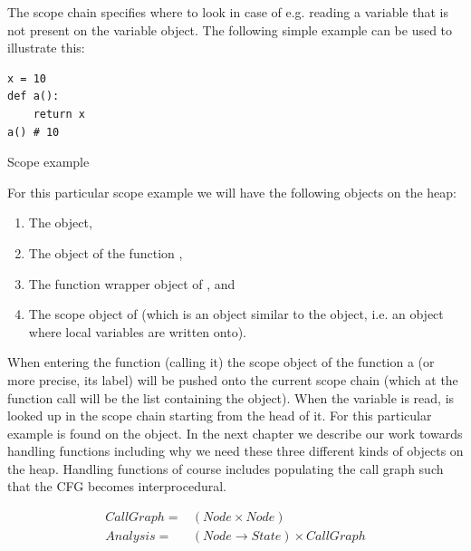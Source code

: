 The scope chain specifies where to look in case of e.g. reading a variable that is not present on the variable object. The following simple example can be used to illustrate this:

\begin{listing}[H]
	\begin{verbatim}
x = 10
def a():
	return x
a() # 10
	\end{verbatim}
\caption{Scope example}\label{code:ScopeExample}
\end{listing}

For this particular scope example we will have the following objects on the heap:

\begin{enumerate}
  \item The  object,
  \item The object of the function ,
  \item The function wrapper object of , and
  \item The scope object of  (which is an object similar to the  object, i.e. an object where local variables are written onto).
\end{enumerate}

When entering the function (calling it) the scope object of the function a (or more precise, its label) will be pushed onto the current scope chain (which at the function call will be the list containing the  object). When the variable  is read,  is looked up in the scope chain starting from the head of it. For this particular example  is found on the  object. In the next chapter we describe our work towards handling functions including why we need these three different kinds of objects on the heap. Handling functions of course includes populating the call graph such that the CFG becomes interprocedural.

\begin{eqnarray*}
CallGraph = & (Node \times Node) \\
Analysis = & (Node \rightarrow State) \times CallGraph
\end{eqnarray*}
